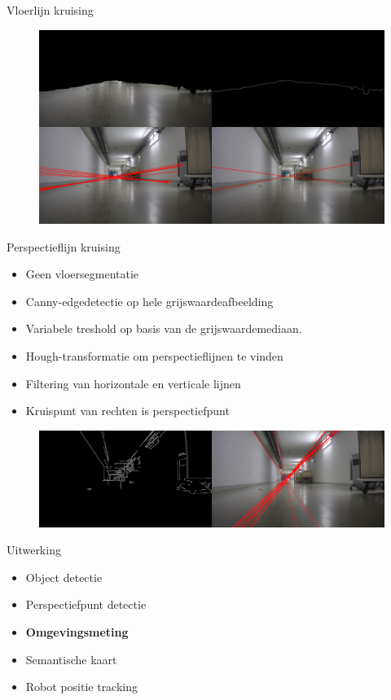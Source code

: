 \documentclass[11pt,t]{beamer}
\begin{document}
\begin{frame}[fragile]{Vloerlijn kruising}
	\begin{figure}
		\centering
		\tiny
		\includegraphics[width=\textwidth]{graphics/hough_floor.png}
	\end{figure}
\end{frame}

\begin{frame}[fragile]{Perspectieflijn kruising}
	\begin{itemize}
		\item Geen vloersegmentatie
		\item Canny-edgedetectie op hele grijswaardeafbeelding
		\item Variabele treshold op basis van de grijswaardemediaan. 
		\item Hough-transformatie om perspectieflijnen te vinden
		\item Filtering van horizontale en verticale lijnen
		\item Kruispunt van rechten is perspectiefpunt
	\end{itemize}

	\begin{figure}
		\centering
		\tiny
		\includegraphics[width=\textwidth]{graphics/hough_all.png}
	\end{figure}
\end{frame}

%
%
\begin{frame}[fragile]{Uitwerking}
	\begin{itemize}
		\item Object detectie
		\item Perspectiefpunt detectie
		\item \textbf{Omgevingsmeting}
		\item Semantische kaart
		\item Robot positie tracking
	\end{itemize}
\end{frame}
\end{document}
